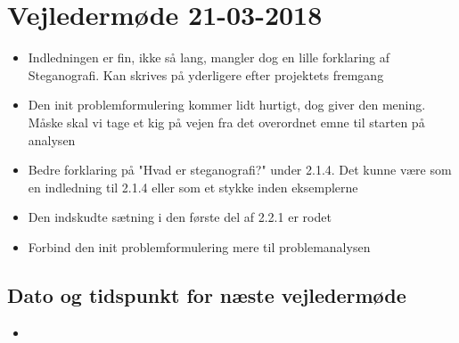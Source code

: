 \newpage
\section{Vejledermøde 21-03-2018}
\begin{itemize}
    \item Indledningen er fin, ikke så lang, mangler dog en lille forklaring af Steganografi. Kan skrives på yderligere efter projektets fremgang
    \item Den init problemformulering kommer lidt hurtigt, dog giver den mening. Måske skal vi tage et kig på vejen fra det overordnet emne til starten på analysen
    \item Bedre forklaring på "Hvad er steganografi?" under 2.1.4. Det kunne være som en indledning til 2.1.4 eller som et stykke inden eksemplerne
    \item Den indskudte sætning i den første del af 2.2.1 er rodet
    \item Forbind den init problemformulering mere til problemanalysen
\end{itemize}
\subsection{Dato og tidspunkt for næste vejledermøde}
\begin{itemize}
    \item 
\end{itemize}
